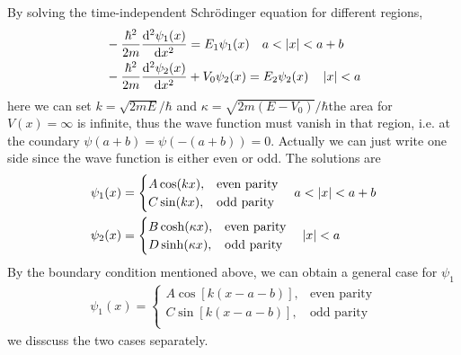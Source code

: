 By solving the time-independent Schrödinger equation for different regions, 
\begin{align}
    &- \frac{\hbar^2}{2m} \frac{\mathrm{d}^2 \psi_1(x)}{\mathrm{d} x^2}  = E_1 \psi_1(x) \quad a<\left| x \right|<a+b\\
    &- \frac{\hbar^2}{2m} \frac{\mathrm{d}^2 \psi_2(x)}{\mathrm{d} x^2} + V_0 \psi_2(x) = E_2 \psi_2(x) \quad  \left| x \right| < a 
\end{align}
here we can set $k = \sqrt{2mE}/\hbar$ and $\kappa = \sqrt{2m(E-V_0)}/\hbar $the area for $V(x) = \infty$ is infinite, thus the wave function must vanish in that region, i.e. at the coundary $\psi(a+b) = \psi(-(a+b)) = 0$. Actually we can just write one side since the wave function is either even or odd. The solutions are 
\begin{align}
    \psi_1(x) &= \begin{cases}
        A \cos(k x), & \text{even parity} \\
        C \sin(k x), & \text{odd parity} \\
\end{cases} \quad a< \left| x \right| < a+b \\
    \psi_2(x) &= \begin{cases}
        B \cosh(\kappa x), & \text{even parity} \\
        D \sinh(\kappa x), & \text{odd parity} \\
    \end{cases} \quad \left| x \right| < a
\end{align}
By the boundary condition mentioned above, we can obtain a general case for $\psi_1$
\begin{align}
    \psi_1(x) = \begin{cases}
        A \cos\left[k(x - a - b)\right], & \text{even parity} \\
        C \sin\left[k(x - a - b)\right], & \text{odd parity} \\
\end{cases} 
\end{align}
we disscuss the two cases separately.
